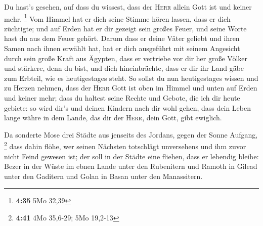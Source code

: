 Du hast's gesehen, auf dass du wissest, dass der
\textsc{Herr} allein Gott ist und keiner mehr. \footnote{\textbf{4:35}
  5Mo 32,39}  Vom Himmel hat er dich seine Stimme hören
lassen, dass er dich züchtigte; und auf Erden hat er dir gezeigt sein
großes Feuer, und seine Worte hast du aus dem Feuer gehört.
 Darum dass er deine Väter geliebt und ihren Samen nach
ihnen erwählt hat, hat er dich ausgeführt mit seinem Angesicht durch
sein große Kraft aus Ägypten,  dass er vertriebe vor dir
her große Völker und stärkere, denn du bist, und dich hineinbrächte,
dass er dir ihr Land gäbe zum Erbteil, wie es heutigestages steht.
 So sollst du nun heutigestages wissen und zu Herzen
nehmen, dass der \textsc{Herr} Gott ist oben im Himmel und unten auf
Erden und keiner mehr;  dass du haltest seine Rechte und
Gebote, die ich dir heute gebiete: so wird dir's und deinen Kindern nach
dir wohl gehen, dass dein Leben lange währe in dem Lande, das dir der
\textsc{Herr}, dein Gott, gibt ewiglich.

 Da sonderte Mose drei Städte aus jenseits des Jordans,
gegen der Sonne Aufgang, \footnote{\textbf{4:41} 4Mo 35,6-29; 5Mo
  19,2-13}  dass dahin flöhe, wer seinen Nächsten
totschlägt unversehens und ihm zuvor nicht Feind gewesen ist; der soll
in der Städte eine fliehen, dass er lebendig bleibe: 
Bezer in der Wüste im ebnen Lande unter den Rubenitern und Ramoth in
Gilead unter den Gaditern und Golan in Basan unter den Manassitern.

